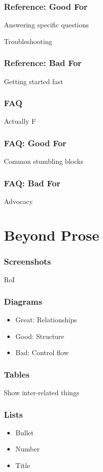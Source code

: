 \begin{frame}
\frametitle{Reference: Good For}

Answering specific questions

Troubleshooting
\end{frame}


\begin{frame}
\frametitle{Reference: Bad For}
Getting started fast
\end{frame}

\begin{frame}
\frametitle{FAQ}
Actually F
\end{frame}

\begin{frame}
\frametitle{FAQ: Good For}

Common stumbling blocks
\end{frame}

\begin{frame}
\frametitle{FAQ: Bad For}
Advocacy
\end{frame}


\section{Beyond Prose}


\begin{frame}
\frametitle{Screenshots}

RoI
\end{frame}

\begin{frame}
\frametitle{Diagrams}

\begin{itemize}
\item Great: Relationships
\item Good: Structure
\item Bad: Control flow
\end{itemize}


\end{frame}


\begin{frame}
\frametitle{Tables}

Show inter-related things
\end{frame}

\begin{frame}
\frametitle{Lists}

\begin{itemize}
\item Bullet
\item Number
\item Title
\end{itemize}

\end{frame}

